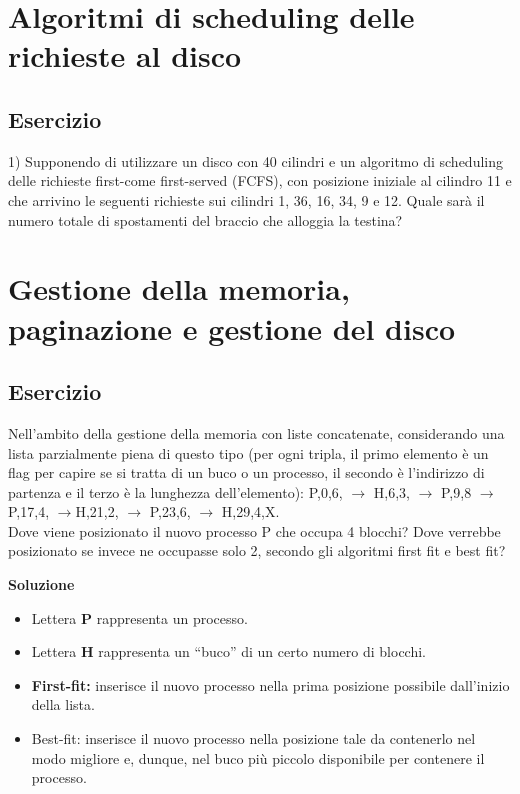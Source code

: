 \documentclass{article}
\begin{document}
\section{Algoritmi di scheduling delle richieste al disco}
\subsection{Esercizio}
1) Supponendo di utilizzare un disco con 40 cilindri e un
algoritmo di scheduling delle richieste first-come first-served
(FCFS), con posizione iniziale al cilindro 11 e che arrivino le
seguenti richieste sui cilindri 1, 36, 16, 34, 9 e 12. Quale sarà il
numero totale di spostamenti del braccio che alloggia la testina?

\fi


\section{Gestione della memoria, paginazione e gestione del disco}
\subsection{Esercizio}
 Nell’ambito della gestione della memoria con liste concatenate,
considerando una lista parzialmente piena di questo tipo (per ogni tripla, il primo elemento è un flag per capire se si tratta di un buco o un processo, il secondo è l’indirizzo di partenza e il terzo è la lunghezza dell’elemento):
P,0,6, $\rightarrow$ H,6,3,  $\rightarrow$ P,9,8  $\rightarrow$ P,17,4,  $\rightarrow$H,21,2,  $\rightarrow$ P,23,6,  $\rightarrow$ H,29,4,X.\\
Dove viene posizionato il nuovo processo P che occupa 4 blocchi? Dove verrebbe posizionato se invece ne occupasse solo 2, secondo gli algoritmi first fit e best fit?



\vskip 0.5cm
\textbf{Soluzione}\\
\vskip 0.5cm




\begin{itemize}
\item Lettera \textbf{P} rappresenta un processo.
\item Lettera \textbf{H} rappresenta un “buco” di un certo numero di blocchi.
\item \textbf{First-fit:} inserisce il nuovo processo nella prima posizione possibile  dall’inizio della lista.
\item Best-fit: inserisce il nuovo processo nella posizione tale da contenerlo nel modo migliore e, dunque, nel buco più piccolo disponibile per contenere il processo.
\end{itemize}
\end{document}
